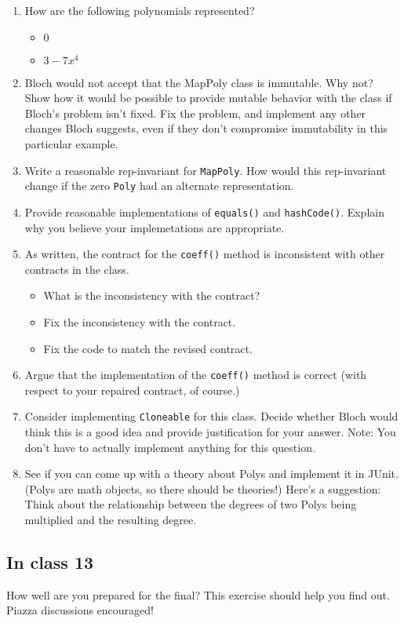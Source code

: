 \documentclass[11pt]{article}
\begin{document}
\begin{enumerate}
\item How are the following polynomials represented?
\begin{itemize}
\item \(0\)
\item \(3-7x^4\)
\end{itemize}
\item Bloch would not accept that the MapPoly class is immutable. Why not? Show how it would be possible to provide mutable behavior with the class if Bloch's problem isn't fixed. Fix the problem, and implement any other changes Bloch suggests, even if they don't compromise immutability in this particular example.
\item Write a reasonable rep-invariant for \texttt{MapPoly}. How would this rep-invariant change if the zero \texttt{Poly} had an alternate representation.
\item Provide reasonable implementations of \texttt{equals()} and \texttt{hashCode()}. Explain why you believe your implemetations are appropriate.
\item As written, the contract for the \texttt{coeff()} method is inconsistent with other contracts in the class.
\begin{itemize}
\item What is the inconsistency with the contract?
\item Fix the inconsistency with the contract.
\item Fix the code to match the revised contract.
\end{itemize}
\item Argue that the implementation of the \texttt{coeff()} method is correct (with respect to your repaired contract, of course.)
\item Consider implementing \texttt{Cloneable} for this class. Decide whether Bloch would think this is a good idea and provide justification for your answer. Note: You don't have to actually implement anything for this question.
\item See if you can come up with a theory about Polys and implement it in JUnit. (Polys are math objects, so there should be theories!) Here's a suggestion: Think about the relationship between the degrees of two Polys being multiplied and the resulting degree.
\end{enumerate}

\subsection{In class 13}
\label{sec:org68e00cb}
How well are you prepared for the final? This exercise should help you find out. Piazza discussions encouraged!
\end{document}
